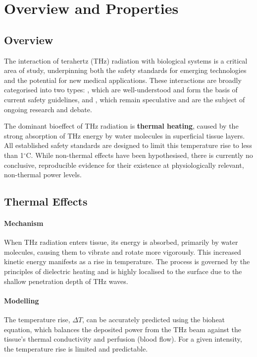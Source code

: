 \section{Overview and Properties}

\subsection{Overview}

The interaction of terahertz (THz) radiation with biological systems is a critical area of study, underpinning both the safety standards for emerging technologies and the potential for new medical applications. These interactions are broadly categorised into two types: , which are well-understood and form the basis of current safety guidelines, and , which remain speculative and are the subject of ongoing research and debate.

\begin{keyconcept}
    The dominant bioeffect of THz radiation is \textbf{thermal heating}, caused by the strong absorption of THz energy by water molecules in superficial tissue layers. All established safety standards are designed to limit this temperature rise to less than 1$^\circ$C. While non-thermal effects have been hypothesised, there is currently no conclusive, reproducible evidence for their existence at physiologically relevant, non-thermal power levels.
\end{keyconcept}


\subsection{Thermal Effects}

\paragraph{Mechanism}
When THz radiation enters tissue, its energy is absorbed, primarily by water molecules, causing them to vibrate and rotate more vigorously. This increased kinetic energy manifests as a rise in temperature. The process is governed by the principles of dielectric heating and is highly localised to the surface due to the shallow penetration depth of THz waves.

\paragraph{Modelling}
The temperature rise, $\Delta T$, can be accurately predicted using the bioheat equation, which balances the deposited power from the THz beam against the tissue's thermal conductivity and perfusion (blood flow). For a given intensity, the temperature rise is limited and predictable.

